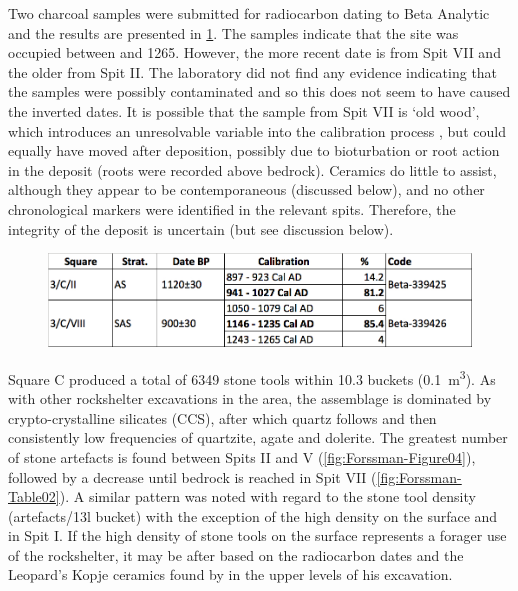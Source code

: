 Two charcoal samples were submitted for radiocarbon dating to Beta Analytic and the results are presented in \cref{fig:Forssman-Table01}. 
The samples indicate that the site was occupied between  and 1265. 
However, the more recent date is from Spit VII and the older from Spit II. 
The laboratory did not find any evidence indicating that the samples were possibly contaminated and so this does not seem to have caused the inverted dates. 
It is possible that the sample from Spit VII is ‘old wood’, which introduces an unresolvable variable into the calibration process \parencite{Kennett_2002}, but could equally have moved after deposition, possibly due to bioturbation \parencite[see][]{Lancaster_2003} or root action in the deposit (roots were recorded above bedrock). 
Ceramics do little to assist, although they appear to be contemporaneous (discussed below), and no other chronological markers were identified in the relevant spits. Therefore, the integrity of the deposit is uncertain (but see discussion below).

	\begin{figure} %
		\includegraphics[width=\linewidth]{figures/Forssman-Table01}
		\label{fig:Forssman-Table01}
	\end{figure}


Square C  produced a total of \num{6349} stone tools within \num{10.3} buckets (\SI{0.1}{\meter\cubed}). 
As with other rockshelter excavations in the area, the assemblage is dominated by crypto-crystalline silicates (CCS), 
after which quartz follows and then consistently low frequencies of quartzite, agate and dolerite. 
The greatest number of stone artefacts is found between Spits II and V (\cref{fig:Forssman-Figure04}), 
followed by a decrease until bedrock is reached in Spit VII (\cref{fig:Forssman-Table02}). 
A similar pattern was noted with regard to the stone tool density (artefacts/13l bucket) with the exception of the high density on the surface and in Spit I. 
If the high density of stone tools on the surface represents a forager use of the rockshelter, it may be after  based on the radiocarbon dates and the Leopard’s Kopje ceramics found by \textcite{Walker_1994} in the upper levels of his excavation. 

